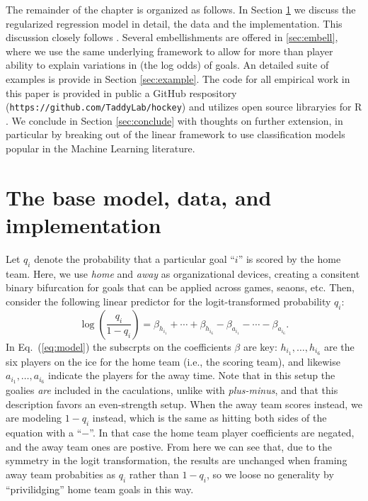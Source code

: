 The remainder of the chapter is organized as follows.  In Section
\ref{sec:base} we discuss the regularized regression model in detail, the data
and the implementation.  This discussion closely follows
\cite{gramacy:jensen:taddy:2013}.  Several embellishments are offered in
\ref{sec:embell}, where we use the same underlying framework to allow
for more than player ability to explain variations in (the log odds) of goals.
An detailed suite of examples is provide in Section \ref{sec:example}. The
code for all empirical work in this paper is provided in public a GitHub
respository (\verb!https://github.com/TaddyLab/hockey!) and utilizes open
source libraryies for {\sf R} \cite{cranR}.  We conclude in Section
\ref{sec:conclude} with thoughts on further extension, in particular by
breaking out of the linear framework to use classification models
popular in the Machine Learning literature.

\section{The base model, data, and implementation}
\label{sec:base}

Let $q_i$ denote the probability that a particular goal ``$i$'' is scored by
the home team.  Here, we use {\em home} and {\em away} as organizational devices,
creating a consitent binary bifurcation for goals that can be applied across games,
seaons, etc.  Then, consider the following linear predictor
for the logit-transformed probability $q_i$:
\begin{equation}
\log \left(\frac{q_i}{1-q_i} \right) = \beta_{h_{i_1}} + \cdots + \beta_{h_{i_6}} - 
\beta_{a_{i_1}} - \cdots - \beta_{a_{i_6}}.
\label{eq:model}
\end{equation}
In Eq.~(\ref{eq:model}) the subscrpts on the coefficients $\beta$ are
key: $h_{i_1}, \dots, h_{i_6}$ are the six players on the ice for the home
team (i.e., the scoring team), and likewise $a_{i_1}, \dots, a_{i_6}$ indicate
the players for the away time.  Note that in this setup the goalies {\em are}
included in the caculations, unlike with {\em plus-minus}, and that this
description favors an even-strength setup.  When the away team scores instead,
we are modeling $1-q_i$ instead, which is the same as hitting both sides of
the equation with a ``$-$''.  In that case the home team player coefficients
are negated, and the away team ones are postive.  From here we can see that,
due to the symmetry in the logit transformation, the results are unchanged
when framing away team probabities as $q_i$ rather than $1-q_i$, so we loose
no generality by ``privilidging'' home team goals in this way.

